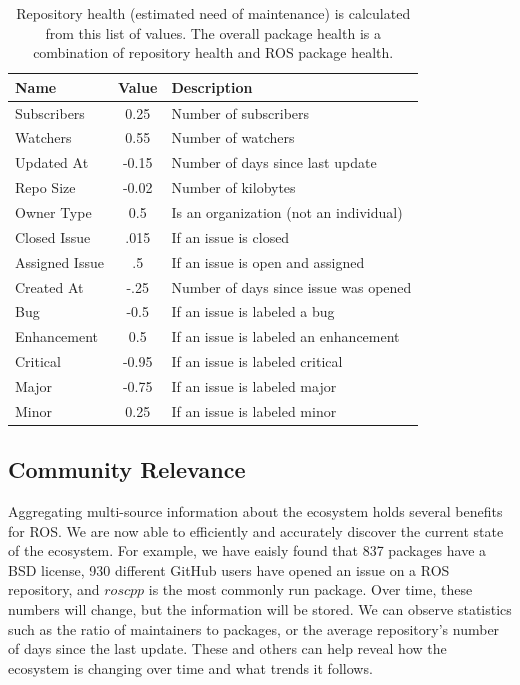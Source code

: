 \documentclass[letterpaper, 10 pt, conference]{ieeeconf}  %
\begin{document}
\begin{table}
\centering
\begin{tabular}{|l|c|l|}
\hline
Name & Value & Description \\
\hline
Subscribers & 0.25 & Number of subscribers \\
\hline
Watchers & 0.55 & Number of watchers \\
\hline
Updated At & -0.15 & Number of days since last update \\
\hline
Repo Size & -0.02 & Number of kilobytes \\
\hline
Owner Type & 0.5 & Is an organization (not an individual) \\
\hline
Closed Issue & .015 & If an issue is closed \\
\hline
Assigned Issue & .5 & If an issue is open and assigned \\
\hline
Created At & -.25 & Number of days since issue was opened \\ 
\hline
Bug & -0.5 & If an issue is labeled a bug \\
\hline
Enhancement & 0.5 & If an issue is labeled an enhancement \\
\hline
Critical & -0.95 & If an issue is labeled critical \\
\hline
Major & -0.75 & If an issue is labeled major \\
\hline
Minor & 0.25 & If an issue is labeled minor \\
\hline
\end{tabular}
\caption{Repository health (estimated need of maintenance) is calculated from this list of values. The overall package health is a combination of repository health and ROS package health.}
\label{HealthGithub}
\end{table}

\subsection{Community Relevance}

Aggregating multi-source information about the ecosystem holds several benefits for ROS. We are now able to efficiently and accurately discover the current state of the ecosystem. For example, we have eaisly found that 837 packages have a BSD license, 930 different GitHub users have opened an issue on a ROS repository, and $roscpp$ is the most commonly run package. Over time, these numbers will change, but the information will be stored. We can observe statistics such as the ratio of maintainers to packages, or the average repository's number of days since the last update. These and others can help reveal how the ecosystem is changing over time and what trends it follows. 
\end{document}
